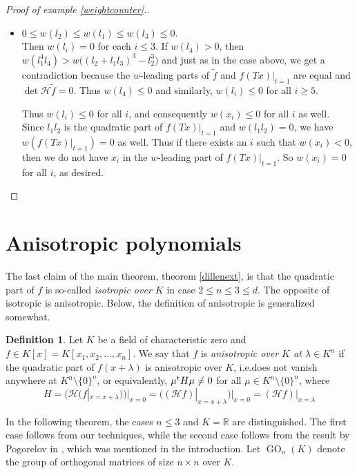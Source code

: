 \documentclass[10pt]{article}
\theoremstyle{remark}
\theoremstyle{definition}
\newtheorem{definition}[theorem]{Definition}
\newcommand{\hess}{{\mathcal H}}
\newcommand{\GO}{\operatorname{GO}}
\newcommand{\R}{{\mathbb R}}
\newcommand{\tp}{^{\rm t}}
\begin{document}
\begin{proof}[Proof of example \ref{weightcounter}.]
\begin{itemize}
\item $0 \le w(l_2) \le w(l_1) \le w(l_3) \le 0$. \\
Then $w(l_i) = 0$ for each $i \le 3$. If $w(l_4) > 0$, then 
$w(l_1^4 l_4) > w\big((l_2 + l_1 l_3)^3 - l_2^3\big)$ and just as in the case above,
we get a contradiction because the $w$-leading parts of $\tilde{f}$ and $f(Tx)|_{t=1}$ are 
equal and $\det \hess \tilde{f} = 0$. Thus $w(l_4) \le 0$ and similarly, 
$w(l_i) \le 0$ for all $i \ge 5$.

Thus $w(l_i) \le 0$ for all $i$, and consequently $w(x_i) \le 0$ for all $i$ as well.
Since $l_1 l_2$ is the quadratic part of $f(Tx)|_{t=1}$ and $w(l_1 l_2) = 0$, we have
$w(f(Tx)|_{t=1}) = 0$ as well. Thus if there exists an $i$ such that $w(x_i) < 0$, 
then we do not have $x_i$ in the $w$-leading part of $f(Tx)|_{t=1}$. So $w(x_i) = 0$ 
for all $i$, as desired. \qedhere

\end{itemize}
\end{proof}


\section{Anisotropic polynomials} \label{last}

The last claim of the main theorem, theorem \ref{dillenext}, is that the quadratic part
of $f$ is so-called {\em isotropic over $K$} in case $2 \le n \le 3 \le d$. The opposite of isotropic 
is anisotropic. Below, the definition of anisotropic is generalized somewhat.

\begin{definition}
Let $K$ be a field of characteristic zero and $f \in K[x] = K[x_1,x_2,\ldots,x_n]$. 
We say that $f$ is {\em anisotropic over $K$ at $\lambda \in K^n$} if the quadratic part
of $f(x+\lambda)$ is anisotropic over $K$, i.e.\@ does not vanish anywhere at $K^n \setminus \{0\}^n$, 
or equivalently, $\mu\tp H \mu \ne 0$ for all $\mu \in K^n \setminus \{0\}^n$, where
\begin{equation} \label{aneq}
H = \big(\hess(f|_{x=x+\lambda})\big)\big|_{x=0} 
  = \big((\hess f)|_{x=x+\lambda}\big)\big|_{x=0} = (\hess f)|_{x=\lambda}
\end{equation}
\end{definition}

\noindent
In the following theorem, the cases $n \le 3$ and $K = \R$ are distinguished. The first case
follows from our techniques, while the second case follows from the result by Pogorelov 
in \cite{MR0319126}, which was mentioned in the introduction. Let $\GO_n(K)$ denote the group
of orthogonal matrices of size $n \times n$ over $K$.
\end{document}
